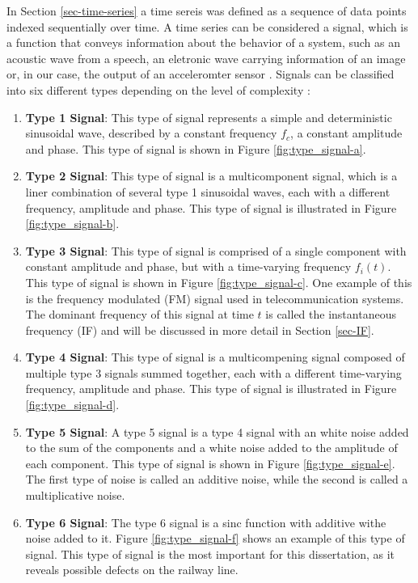 In Section \ref{sec-time-series} a time sereis was defined as a sequence of data points indexed sequentially over time. A time series can be considered a signal, which is a function that conveys information about the behavior of a system, such as an acoustic wave from a speech, an eletronic wave carrying information of an image or, in our case, the output of an acceleromter sensor \cite{priemer1991introductory}. Signals can be classified into six different types depending on the level of complexity \cite{Boashash2016ChapterITimeFrequency}:
\begin{enumerate}
    \item \textbf{Type 1 Signal}: This type of signal represents a simple and deterministic sinusoidal wave, described by a constant frequency $f_c$, a constant amplitude and phase. This type of signal is shown in Figure \ref{fig:type_signal-a}.
    \item \textbf{Type 2 Signal}: This type of signal is a multicomponent signal, which is a liner combination of several type 1 sinusoidal waves, each with a different frequency, amplitude and phase. This type of signal is illustrated in Figure \ref{fig:type_signal-b}.
    \item \textbf{Type 3 Signal}: This type of signal is comprised of a single component with constant amplitude and phase, but with a time-varying frequency $f_i(t)$. This type of signal is shown in Figure \ref{fig:type_signal-c}. One example of this is the frequency modulated (FM) signal used in telecommunication systems. The dominant frequency of this signal at time $t$ is called the instantaneous frequency (IF) and will be discussed in more detail in Section \ref{sec-IF}.
    \item \textbf{Type 4 Signal}: This type of signal is a multicompening signal composed of multiple type 3 signals summed together, each with a different time-varying frequency, amplitude and phase. This type of signal is illustrated in Figure \ref{fig:type_signal-d}.
    \item \textbf{Type 5 Signal}: A type 5 signal is a type 4 signal with an white noise added to the sum of the components and a white noise added to the amplitude of each component. This type of signal is shown in Figure \ref{fig:type_signal-e}. The first type of noise is called an additive noise, while the second is called a multiplicative noise. 
    \item \textbf{Type 6 Signal}: The type 6 signal is a sinc function with additive withe noise added to it. Figure \ref{fig:type_signal-f} shows an example of this type of signal. This type of signal is the most important for this dissertation, as it reveals possible defects on the railway line.
\end{enumerate}

